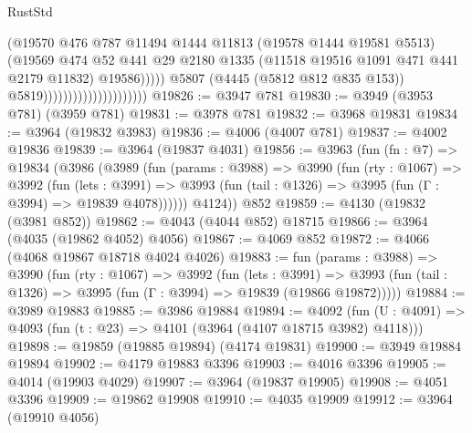 \begin{lexlean}{RustStd}
\begin{coremodule}
{\begin{coremodule}
{{{{{{{{{{{{{{{{{{{{{{{{{{{{{{{{{{{{{{                                                    (@19570
                                                      @476
                                                      @787
                                                      @11494
                                                      @1444
                                                      @11813
                                                      (@19578 @1444 @19581 @5513)
                                                      (@19569
                                                        @474
                                                        @52
                                                        @441
                                                        @29
                                                        @2180
                                                        @1335
                                                        (@11518 @19516 @1091 @471 @441 @2179 @11832)
                                                        @19586)))))
                                              @5807
                                              (@4445 (@5812 @812 @835 @153))
                                              @5819)))))))))))))))))))))
@19826 := @3947 @781
@19830 := @3949 (@3953 @781) (@3959 @781)
@19831 := @3978 @781
@19832 := @3968 @19831
@19834 := @3964 (@19832 @3983)
@19836 := @4006 (@4007 @781)
@19837 := @4002 @19836
@19839 := @3964 (@19837 @4031)
@19856 := @3963
    (fun (fn : @7) =>
    @19834
      (@3986
        (@3989
          (fun (params : @3988) =>
          @3990
            (fun (rty : @1067) =>
            @3992
              (fun (lets : @3991) =>
              @3993 (fun (tail : @1326) => @3995 (fun (Γ : @3994) => @19839 @4078))))))
        @4124))
    @852
@19859 := @4130 (@19832 (@3981 @852))
@19862 := @4043 (@4044 @852) @18715
@19866 := @3964 (@4035 (@19862 @4052) @4056)
@19867 := @4069 @852
@19872 := @4066 (@4068 @19867 @18718 @4024 @4026)
@19883 := fun (params : @3988) =>
  @3990
    (fun (rty : @1067) =>
    @3992
      (fun (lets : @3991) =>
      @3993 (fun (tail : @1326) => @3995 (fun (Γ : @3994) => @19839 (@19866 @19872)))))
@19884 := @3989 @19883
@19885 := @3986 @19884
@19894 := @4092
    (fun (U : @4091) => @4093 (fun (t : @23) => @4101 (@3964 (@4107 @18715 @3982) @4118)))
@19898 := @19859 (@19885 @19894) (@4174 @19831)
@19900 := @3949 @19884 @19894
@19902 := @4179 @19883 @3396
@19903 := @4016 @3396
@19905 := @4014 (@19903 @4029)
@19907 := @3964 (@19837 @19905)
@19908 := @4051 @3396
@19909 := @19862 @19908
@19910 := @4035 @19909
@19912 := @3964 (@19910 @4056)
}}}}}}}}}}}}}}}}}}}}}}}}}}}}}}}}}}}}}}
\end{coremodule}}
\end{coremodule}
\end{lexlean}
